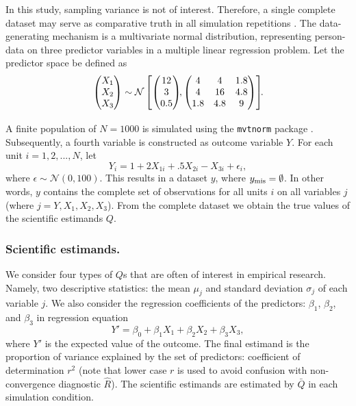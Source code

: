 \documentclass[Royal,times,sageh]{sagej}
\begin{document}
In this study, sampling variance is not of interest. Therefore, a single complete dataset may serve as comparative truth in all simulation repetitions \citep{vink14}. The data-generating mechanism is a multivariate normal distribution, representing person-data on three predictor variables in a multiple linear regression problem. Let the predictor space be defined as
\[
\begin{aligned}
\begin{pmatrix}X_1\\
X_2\\
X_3
\end{pmatrix} \sim \mathcal{N}
\begin{bmatrix}
\begin{pmatrix}
12\\
3\\
0.5
\end{pmatrix}\!\!,
\begin{pmatrix}
4 & 4 & 1.8 \\
4 & 16 & 4.8\\
1.8 & 4.8 & 9
\end{pmatrix}
\end{bmatrix}\!\!\text{.}\\[2\jot]
\end{aligned}
\]
A finite population of \(N=1000\) is simulated using the \texttt{mvtnorm} package \citep{mvtnorm}. Subsequently, a fourth variable is constructed as outcome variable \(Y\). For each unit \(i = 1, 2,..., N\), let
\[
Y_i = 1 + 2X_{1i} +.5X_{2i} - X_{3i} + \epsilon_i ,
\]
where \(\epsilon \sim \mathcal{N}(0, 100)\). This results in a dataset \(y\), where \(y_{\rm mis} = \emptyset\). In other words, \(y\) contains the complete set of observations for all units \(i\) on all variables \(j\) (where \(j = Y, X_1, X_2, X_3\)). From the complete dataset we obtain the true values of the scientific estimands \(Q\).

\hypertarget{scientific-estimands.}{%
\subsubsection{Scientific estimands.}\label{scientific-estimands.}}

We consider four types of \(Q\)s that are often of interest in empirical research. Namely, two descriptive statistics: the mean \(\mu_j\) and standard deviation \(\sigma_j\) of each variable \(j\). We also consider the regression coefficients of the predictors: \(\beta_1\), \(\beta_2\), and \(\beta_3\) in regression equation
\[Y' = \beta_0 + \beta_1 X_1 + \beta_2 X_2 + \beta_3 X_3,\]
where \(Y'\) is the expected value of the outcome. The final estimand is the proportion of variance explained by the set of predictors: coefficient of determination \(r^2\) (note that lower case \(r\) is used to avoid confusion with non-convergence diagnostic \(\widehat{R}\)). The scientific estimands are estimated by \(\bar{Q}\) in each simulation condition.
\end{document}
